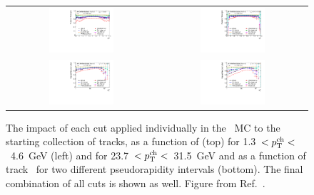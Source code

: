 \begin{figure}
\centering
\begin{tabular}{cc}
\includegraphics[width=0.45\textwidth]{figures/main/performance/cut_flow_RecoNorm_MC_pT_4_6_jet.pdf} &
\includegraphics[width=0.45\textwidth]{figures/main/performance/cut_flow_RecoNorm_MC_pT_23p7_31p5_jet.pdf} \\
\includegraphics[width=0.45\textwidth]{figures/main/performance/cut_flow_RecoNorm_MC_eta_0p05_jet.pdf} &
\includegraphics[width=0.45\textwidth]{figures/main/performance/cut_flow_RecoNorm_MC_eta_2p05_jet.pdf} \\
\end{tabular}
\caption{The impact of each cut applied individually in the \pp\ MC to the starting collection of tracks, as a function of
\etatrk (top) for 1.3~$< \pttrk<$~4.6~GeV (left) and for 23.7~$<\pttrk<$~31.5~GeV and as a function of track \pT\ for two different pseudorapidity intervals (bottom).
The final combination of all cuts is shown as well.
Figure from Ref.~\cite{Sickles:2235420}.}
\label{fig:ppcutflow_eta}
\end{figure}

